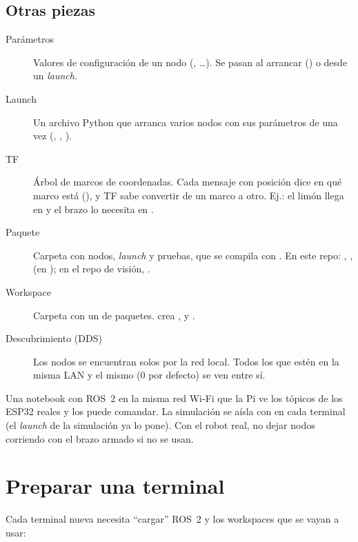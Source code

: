 \subsection{Otras piezas}
\begin{description}
  \item[Parámetros] Valores de configuración de un nodo (, \ldots). Se pasan al
        arrancar () o desde un \textit{launch}.
  \item[Launch] Un archivo Python que arranca varios nodos con sus parámetros de una vez
        (, , ).
  \item[TF] Árbol de marcos de coordenadas. Cada mensaje con posición dice en qué marco está (),
        y TF sabe convertir de un marco a otro. Ej.: el limón llega en  y el brazo lo necesita en
        .
  \item[Paquete] Carpeta con nodos, \textit{launch} y pruebas, que se compila con . En este repo:
        , ,  (en ); en el repo de visión,
        .
  \item[Workspace] Carpeta con un  de paquetes.  crea ,
         y .
  \item[Descubrimiento (DDS)] Los nodos se encuentran solos por la red local. Todos los que estén en la misma LAN y el
        mismo  (0 por defecto) se ven entre sí.
\end{description}

\begin{peligro}
Una notebook con ROS~2 en la misma red Wi-Fi que la Pi ve los tópicos de los ESP32 reales y los puede comandar. La
simulación se aísla con  en cada terminal (el \textit{launch}
de la simulación ya lo pone). Con el robot real, no dejar nodos corriendo con el brazo armado si no se usan.
\end{peligro}

\section{Preparar una terminal}

Cada terminal nueva necesita ``cargar'' ROS~2 y los workspaces que se vayan a usar:

